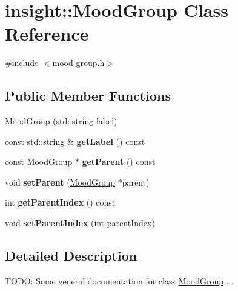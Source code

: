 \hypertarget{classinsight_1_1MoodGroup}{}\section{insight\+:\+:Mood\+Group Class Reference}
\label{classinsight_1_1MoodGroup}


{\ttfamily \#include $<$mood-\/group.\+h$>$}

\subsection*{Public Member Functions}
\begin{DoxyCompactItemize}
\item 
\hyperlink{classinsight_1_1MoodGroup_a914e6e6ac718b5b42b132d91a6389880}{Mood\+Group} (std\+::string label)
\item 
const std\+::string \& {\bfseries get\+Label} () const \hypertarget{classinsight_1_1MoodGroup_a23474e6d113c37951591b7208b4fff34}{}\label{classinsight_1_1MoodGroup_a23474e6d113c37951591b7208b4fff34}

\item 
const \hyperlink{classinsight_1_1MoodGroup}{Mood\+Group} $\ast$ {\bfseries get\+Parent} () const \hypertarget{classinsight_1_1MoodGroup_a4ed28961b875ef2e020ee0e449c59c14}{}\label{classinsight_1_1MoodGroup_a4ed28961b875ef2e020ee0e449c59c14}

\item 
void {\bfseries set\+Parent} (\hyperlink{classinsight_1_1MoodGroup}{Mood\+Group} $\ast$parent)\hypertarget{classinsight_1_1MoodGroup_a78c56a41c3f1470ebc4ffb25513dab5c}{}\label{classinsight_1_1MoodGroup_a78c56a41c3f1470ebc4ffb25513dab5c}

\item 
int {\bfseries get\+Parent\+Index} () const \hypertarget{classinsight_1_1MoodGroup_a66f78a12463ec53e3b8021a85c9bdf87}{}\label{classinsight_1_1MoodGroup_a66f78a12463ec53e3b8021a85c9bdf87}

\item 
void {\bfseries set\+Parent\+Index} (int parent\+Index)\hypertarget{classinsight_1_1MoodGroup_af7b72a0381139f35731a170014926918}{}\label{classinsight_1_1MoodGroup_af7b72a0381139f35731a170014926918}

\end{DoxyCompactItemize}


\subsection{Detailed Description}
T\+O\+DO\+: Some general documentation for class \hyperlink{classinsight_1_1MoodGroup}{Mood\+Group} ... 

